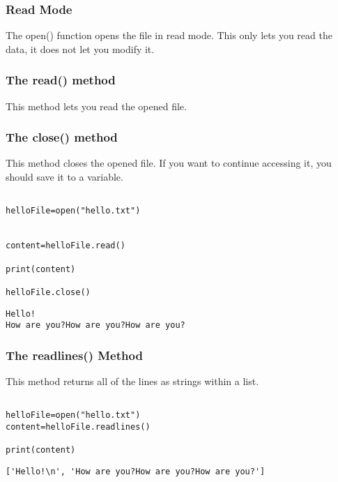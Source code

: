 \documentclass[11pt]{article}
\begin{document}
\subsubsection{Read Mode}
\label{sec:org237e43a}

The open() function opens the file in read mode. This only lets you read the data, it does not let you modify it.

\subsubsection{The read() method}
\label{sec:org65b4a4f}

This method lets you read the opened file.

\subsubsection{The close() method}
\label{sec:org6ef3382}

This method closes the opened file. If you want to continue accessing it, you should save it to a variable.

\begin{verbatim}

helloFile=open("hello.txt")


content=helloFile.read()

print(content)

helloFile.close()

\end{verbatim}

\begin{verbatim}
Hello!
How are you?How are you?How are you?
\end{verbatim}

\subsubsection{The readlines() Method}
\label{sec:org6f77e1a}

This method returns all of the lines as strings within a list.

\begin{verbatim}

helloFile=open("hello.txt")
content=helloFile.readlines()

print(content)

\end{verbatim}

\begin{verbatim}
['Hello!\n', 'How are you?How are you?How are you?']
\end{verbatim}
\end{document}
